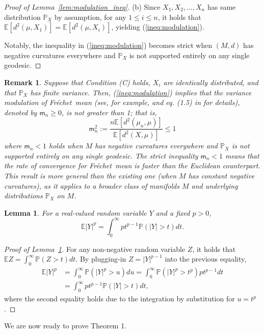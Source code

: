 \documentclass[preprint]{imsart}
\def\Frechet{Fr\'{e}chet}
\theoremstyle{plain}
\newtheorem{lemma}{Lemma}
\newtheorem{remark}{Remark}
\theoremstyle{remark}
\begin{document}
\begin{appendix}
\begin{proof}[Proof of Lemma~\ref{lem:modulation_ineq}]
(b) Since $X_{1}, X_2, \ldots, X_n$ has same distribution $\mathbb{P}_{X}$ by assumption, for any $1\le i\le n$, it holds that $\mathbb{E}[d^2(\mu, X_1)]=\mathbb{E}[d^2(\mu, X_i)]$, yielding (\ref{ineq:modulation}). 


Notably, the inequality in (\ref{ineq:modulation}) becomes strict when $(M,d)$ has negative curvatures everywhere and $\mathbb{P}_X$ is not supported entirely on any single geodesic.
\end{proof}



 \begin{remark} 
         Suppose that Condition (C) holds, $X_i$ are identically distributed, and that $\mathbb{P}_{X}$ has finite variance. Then, (\ref{ineq:modulation}) implies that the variance modulation of \Frechet\ mean (see, for example, \cite{pennec2019curvature} and eq. (1.5) in \cite{hundrieser2024finite} for details), denoted by $\textsf{m}_{n} \ge 0$,
         is not greater than 1; that is, 
 \[
 \textsf{m}_{n}^2:=\frac{n\mathbb{E}[d^2(\mu_n, \mu)]}{\mathbb{E}[d^2(X, \mu)]} \le 1
 \]
 where $\textsf{m}_n < 1$ holds when $M$ has negative curvatures everywhere and $\mathbb{P}_{X}$ is not supported entirely on any single geodesic. The strict inequality $\textsf{m}_n < 1$ means that the rate of convergence for \Frechet\ mean is faster than the Euclidean counterpart. This result is more general than the existing one \citep[][Theorem 9]{pennec2019curvature} (when $M$ has constant negative curvatures), as it applies to a broader class of manifolds $M$ and underlying distributions $\mathbb{P}_{X}$ on $M$.
 \label{rmk:modulation}
 \end{remark}



\begin{lemma}\label{lem:moment}
For a real-valued random variable $Y$ and a fixed $p > 0$, 
$$
\mathbb{E}|Y|^{p}=\int_{0}^{\infty} pt^{p-1}\mathbb{P}(|Y|>t)dt.
$$
\end{lemma}
\begin{proof}[Proof of Lemma~\ref{lem:moment}]
For any non-negative random variable $Z$, it holds that $\mathbb{E}Z=\int_{0}^{\infty} \mathbb{P}(Z>t)dt$. By plugging-in $Z=|Y|^{p-1}$ into the previous equality,
\begin{align*}
\mathbb{E}|Y|^{p} &= \int_{0}^{\infty}\mathbb{P}(|Y|^p>u)du = \int_{0}^{\infty}\mathbb{P}(|Y|^p>t^p)pt^{p-1}dt \\
&=\int_{0}^{\infty} pt^{p-1}\mathbb{P}(|Y|>t)dt,
\end{align*}
where the second equality holds due to the integration by substitution for $u=t^{p}$.
\end{proof}
We are now ready to prove Theorem 1.



\end{appendix}
\end{document}
